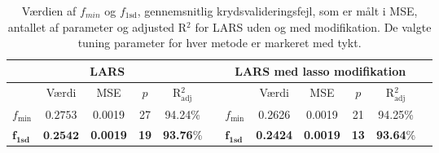 \begin{table}
\center
\begin{tabular}{lccccc | lccccc}
\toprule
 \multicolumn{5}{c}{LARS} & \multicolumn{1}{c}{ }&   \multicolumn{5}{c}{LARS med lasso modifikation}  \\ \midrule
& Værdi & MSE & $p$ &R$^2_{\text{adj}}$ && & Værdi & MSE & $p$ & R$^2_{\text{adj}}$\\
$f_{\text{min}}$ & $0.2753$ &  0.0019 & 27 &94.24\% & & \(f_{\min}\) &  0.2626 & 0.0019 & 21  & 94.25\% \\
$\boldsymbol{f}_{\textbf{1sd}}$ & $\textbf{0.2542} $ & \textbf{0.0019} & \textbf{19} & \textbf{93.76}\%&&$\boldsymbol{f}_{\textbf{1sd}}$ & \textbf{0.2424} & \textbf{0.0019} & \textbf{13 } & \textbf{93.64}\% \\ \bottomrule
 \end{tabular}
\caption{Værdien af $f_{min}$ og $f_{1\text{sd}}$, gennemsnitlig krydsvalideringsfejl, som er målt i MSE, antallet af parameter og adjusted R$^2$ for LARS uden og med modifikation. De valgte tuning parameter for hver metode er markeret med tykt.} \label{tab:lars_lasso_tab}
\end{table}
